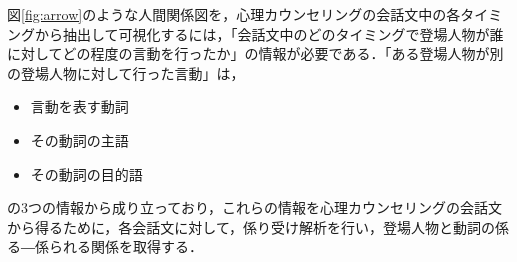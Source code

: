 \documentclass[shuuron]{kuee}
\begin{document}
%


図\ref{fig:arrow}のような人間関係図を，心理カウンセリングの会話文中の各タイミングから抽出して可視化するには，「会話文中のどのタイミングで登場人物が誰に対してどの程度の言動を行ったか」の情報が必要である．「ある登場人物が別の登場人物に対して行った言動」は，
\begin{itemize}
  \item 言動を表す動詞
  \item その動詞の主語
  \item その動詞の目的語
\end{itemize}
の3つの情報から成り立っており，これらの情報を心理カウンセリングの会話文から得るために，各会話文に対して，係り受け解析を行い，登場人物と動詞の係る―係られる関係を取得する．

%
\end{document}

